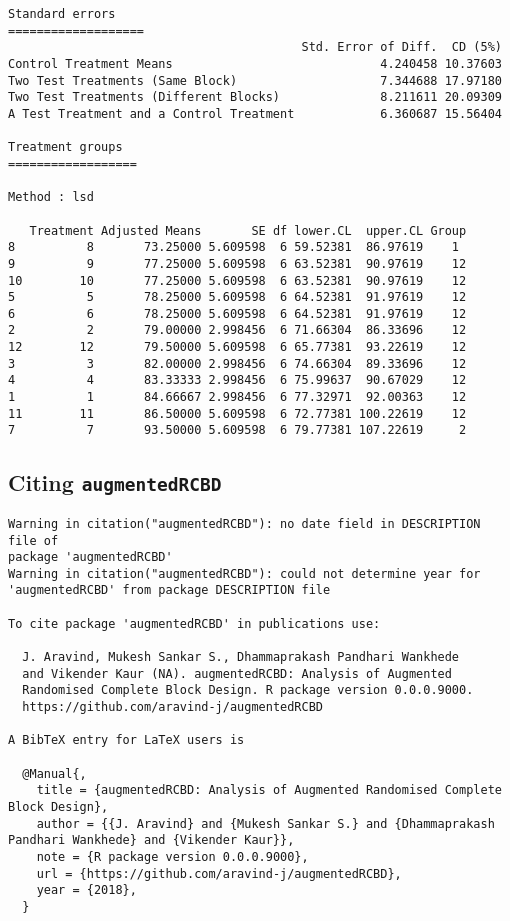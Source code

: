 \documentclass[]{article}
\begin{document}
\begin{verbatim}
Standard errors
===================
                                         Std. Error of Diff.  CD (5%)
Control Treatment Means                             4.240458 10.37603
Two Test Treatments (Same Block)                    7.344688 17.97180
Two Test Treatments (Different Blocks)              8.211611 20.09309
A Test Treatment and a Control Treatment            6.360687 15.56404

Treatment groups
==================

Method : lsd

   Treatment Adjusted Means       SE df lower.CL  upper.CL Group
8          8       73.25000 5.609598  6 59.52381  86.97619    1 
9          9       77.25000 5.609598  6 63.52381  90.97619    12
10        10       77.25000 5.609598  6 63.52381  90.97619    12
5          5       78.25000 5.609598  6 64.52381  91.97619    12
6          6       78.25000 5.609598  6 64.52381  91.97619    12
2          2       79.00000 2.998456  6 71.66304  86.33696    12
12        12       79.50000 5.609598  6 65.77381  93.22619    12
3          3       82.00000 2.998456  6 74.66304  89.33696    12
4          4       83.33333 2.998456  6 75.99637  90.67029    12
1          1       84.66667 2.998456  6 77.32971  92.00363    12
11        11       86.50000 5.609598  6 72.77381 100.22619    12
7          7       93.50000 5.609598  6 79.77381 107.22619     2
\end{verbatim}

\hypertarget{citing-augmentedrcbd}{%
\subsection{\texorpdfstring{Citing
\texttt{augmentedRCBD}}{Citing augmentedRCBD}}\label{citing-augmentedrcbd}}

\begin{verbatim}
Warning in citation("augmentedRCBD"): no date field in DESCRIPTION file of
package 'augmentedRCBD'
Warning in citation("augmentedRCBD"): could not determine year for
'augmentedRCBD' from package DESCRIPTION file

To cite package 'augmentedRCBD' in publications use:

  J. Aravind, Mukesh Sankar S., Dhammaprakash Pandhari Wankhede
  and Vikender Kaur (NA). augmentedRCBD: Analysis of Augmented
  Randomised Complete Block Design. R package version 0.0.0.9000.
  https://github.com/aravind-j/augmentedRCBD

A BibTeX entry for LaTeX users is

  @Manual{,
    title = {augmentedRCBD: Analysis of Augmented Randomised Complete Block Design},
    author = {{J. Aravind} and {Mukesh Sankar S.} and {Dhammaprakash Pandhari Wankhede} and {Vikender Kaur}},
    note = {R package version 0.0.0.9000},
    url = {https://github.com/aravind-j/augmentedRCBD},
    year = {2018},
  }
\end{verbatim}
\end{document}
